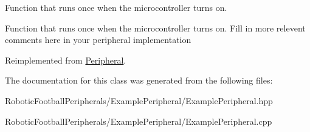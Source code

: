 Function that runs once when the microcontroller turns on. 

Function that runs once when the microcontroller turns on. Fill in more relevent comments here in your peripheral implementation 

Reimplemented from \mbox{\hyperlink{class_peripheral_a2ad7fea98c49d0d319bfa17ca4dcff6c}{Peripheral}}.



The documentation for this class was generated from the following files\+:\begin{DoxyCompactItemize}
\item 
Robotic\+Football\+Peripherals/\+Example\+Peripheral/Example\+Peripheral.\+hpp\item 
Robotic\+Football\+Peripherals/\+Example\+Peripheral/Example\+Peripheral.\+cpp\end{DoxyCompactItemize}
